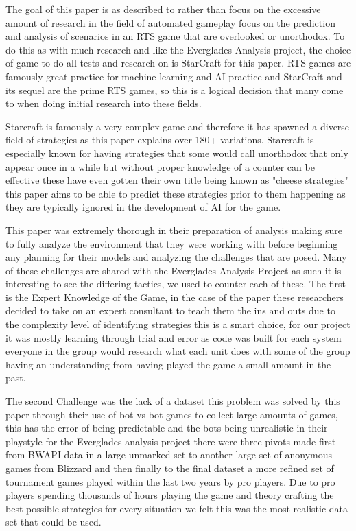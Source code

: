 \documentclass[a4paper,12pt]{report}
\begin{document}
The goal of this paper is as described to rather than focus on the excessive amount of research in the field of automated gameplay focus on the prediction and analysis of scenarios in an RTS game that are overlooked or unorthodox. To do this as with much research and like the Everglades Analysis project, the choice of game to do all tests and research on is StarCraft for this paper. RTS games are famously great practice for machine learning and AI practice and StarCraft and its sequel are the prime RTS games, so this is a logical decision that many come to when doing initial research into these fields.

Starcraft is famously a very complex game and therefore it has spawned a diverse field of strategies as this paper explains over 180+ variations. Starcraft is especially known for having strategies that some would call unorthodox that only appear once in a while but without proper knowledge of a counter can be effective these have even gotten their own title being known as "cheese strategies" this paper aims to be able to predict these strategies prior to them happening as they are typically ignored in the development of AI for the game.
        	
This paper was extremely thorough in their preparation of analysis making sure to fully analyze the environment that they were working with before beginning any planning for their models and analyzing the challenges that are posed. Many of these challenges are shared with the Everglades Analysis Project as such it is interesting to see the differing tactics, we used to counter each of these. The first is the Expert Knowledge of the Game, in the case of the paper these researchers decided to take on an expert consultant to teach them the ins and outs due to the complexity level of identifying strategies this is a smart choice, for our project it was mostly learning through trial and error as code was built for each system everyone in the group would research what each unit does with some of the group having an understanding from having played the game a small amount in the past.

The second Challenge was the lack of a dataset this problem was solved by this paper through their use of bot vs bot games to collect large amounts of games, this has the error of being predictable and the bots being unrealistic in their playstyle for the Everglades analysis project there were three pivots made first from BWAPI data in a large unmarked set to another large set of anonymous games from Blizzard and then finally to the final dataset a more refined set of tournament games played within the last two years by pro players. Due to pro  players spending thousands of hours playing the game and theory crafting the best possible strategies for every situation we felt this was the most realistic data set that could be used.
\end{document}
